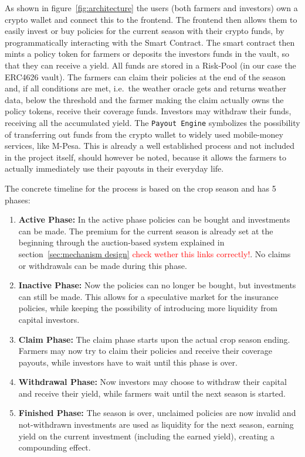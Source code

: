 \documentclass[11pt,a4paper]{article}
\begin{document}
	As shown in figure~\ref{fig:architecture} the users (both farmers and investors) own a crypto wallet and connect this to the frontend.
	The frontend then allows them to easily invest or buy policies for the current season with their crypto funds, by programmatically interacting with the Smart Contract.
	The smart contract then mints a policy token for farmers or deposits the investors funds in the vault, so that they can receive a yield.
	All funds are stored in a Risk-Pool (in our case the ERC4626 vault).
	The farmers can claim their policies at the end of the season and, if all conditions are met, i.e.\ the weather oracle gets and returns weather data, below the threshold and the farmer making the claim actually owns the policy tokens, receive their coverage funds.
	Investors may withdraw their funds, receiving all the accumulated yield.
	The \texttt{Payout Engine} symbolizes the possibility of transferring out funds from the crypto wallet to widely used mobile-money services, like M-Pesa.
	This is already a well established process and not included in the project itself, should however be noted, because it allows the farmers to actually immediately use their payouts in their everyday life.

	The concrete timeline for the process is based on the crop season and has 5 phases:
	\begin{enumerate}
		\item \textbf{Active Phase:} In the active phase policies can be bought and investments can be made.
			The premium for the current season is already set at the beginning through the auction-based system explained in section~\ref{sec:mechanism design} \textcolor{red}{check wether this links correctly!}.
			No claims or withdrawals can be made during this phase.
		\item \textbf{Inactive Phase:} Now the policies can no longer be bought, but investments can still be made.
			This allows for a speculative market for the insurance policies, while keeping the possibility of introducing more liquidity from capital investors.
		\item \textbf{Claim Phase:} The claim phase starts upon the actual crop season ending.
			Farmers may now try to claim their policies and receive their coverage payouts, while investors have to wait until this phase is over.
		\item \textbf{Withdrawal Phase:} Now investors may choose to withdraw their capital and receive their yield, while farmers wait until the next season is started.
		\item \textbf{Finished Phase:} The season is over, unclaimed policies are now invalid and not-withdrawn investments are used as liquidity for the next season, earning yield on the current investment (including the earned yield), creating a compounding effect.
        \label{enum:phases}
	\end{enumerate}
\end{document}
